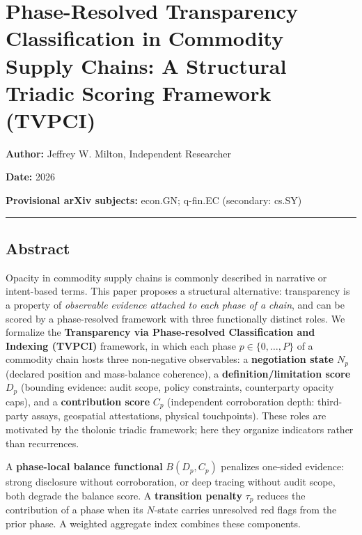 \documentclass[
  11pt,
  letterpaper,
]{article}
\author{}
\date{}
\begin{document}
\section{Phase-Resolved Transparency Classification in Commodity Supply
Chains: A Structural Triadic Scoring Framework
(TVPCI)}\label{phase-resolved-transparency-classification-in-commodity-supply-chains-a-structural-triadic-scoring-framework-tvpci}

\textbf{Author:} Jeffrey W. Milton, Independent Researcher

\textbf{Date:} 2026

\textbf{Provisional arXiv subjects:} econ.GN; q-fin.EC (secondary:
cs.SY)

\begin{center}\rule{0.5\linewidth}{0.5pt}\end{center}

\subsection{Abstract}\label{abstract}

Opacity in commodity supply chains is commonly described in narrative or
intent-based terms. This paper proposes a structural alternative:
transparency is a property of \emph{observable evidence attached to each
phase of a chain}, and can be scored by a phase-resolved framework with
three functionally distinct roles. We formalize the \textbf{Transparency
via Phase-resolved Classification and Indexing (TVPCI)} framework, in
which each phase \(p \in \{0,\ldots,P\}\) of a commodity chain hosts
three non-negative observables: a \textbf{negotiation state} \(N_p\)
(declared position and mass-balance coherence), a
\textbf{definition/limitation score} \(D_p\) (bounding evidence: audit
scope, policy constraints, counterparty opacity caps), and a
\textbf{contribution score} \(C_p\) (independent corroboration depth:
third-party assays, geospatial attestations, physical touchpoints).
These roles are motivated by the tholonic triadic framework; here they
organize indicators rather than recurrences.

A \textbf{phase-local balance functional} \(B(D_p, C_p)\) penalizes
one-sided evidence: strong disclosure without corroboration, or deep
tracing without audit scope, both degrade the balance score. A
\textbf{transition penalty} \(\tau_p\) reduces the contribution of a
phase when its \(N\)-state carries unresolved red flags from the prior
phase. A weighted aggregate index combines these components.
\end{document}
